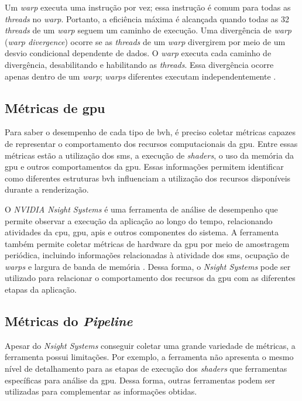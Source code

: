 Um \textit{warp} executa uma instrução por vez; essa instrução é comum para todas as \textit{threads} no \textit{warp}. Portanto, a eficiência máxima é alcançada quando todas as 32 \textit{threads} de um \textit{warp} seguem um caminho de execução. Uma divergência de \textit{warp} (\textit{warp divergence}) ocorre se as \textit{threads} de um \textit{warp} divergirem por meio de um desvio condicional dependente de dados. O \textit{warp} executa cada caminho de divergência, desabilitando e habilitando as \textit{threads}. Essa divergência ocorre apenas dentro de um \textit{warp}; \textit{warps} diferentes executam independentemente \cite{guide2020cuda}.



\subsection{Métricas de \gls{gpu}}

Para saber o desempenho de cada tipo de \gls{bvh}, é preciso coletar métricas capazes de representar o comportamento dos recursos computacionais da \gls{gpu}. Entre essas métricas estão a utilização dos \glspl{sm}, a execução de \textit{shaders}, o uso da memória da \gls{gpu} e outros comportamentos da \gls{gpu}. Essas informações permitem identificar como diferentes estruturas \gls{bvh} influenciam a utilização dos recursos disponíveis durante a renderização.

O \textit{NVIDIA Nsight Systems} é uma ferramenta de análise de desempenho que permite observar a execução da aplicação ao longo do tempo, relacionando atividades da \gls{cpu}, \gls{gpu}, \glspl{api} e outros componentes do sistema. A ferramenta também permite coletar métricas de hardware da \gls{gpu} por meio de amostragem periódica, incluindo informações relacionadas à atividade dos \glspl{sm}, ocupação de \textit{warps} e largura de banda de memória \cite{nvidia_nsight_systems}. Dessa forma, o \textit{Nsight Systems} pode ser utilizado para relacionar o comportamento dos recursos da \gls{gpu} com as diferentes etapas da aplicação.

\subsection{Métricas do \textit{Pipeline}}

Apesar do \textit{Nsight Systems} conseguir coletar uma grande variedade de métricas, a ferramenta possui limitações. Por exemplo, a ferramenta não apresenta o mesmo nível de detalhamento para as etapas de execução dos \textit{shaders} que ferramentas específicas para análise da \gls{gpu}. Dessa forma, outras ferramentas podem ser utilizadas para complementar as informações obtidas.

